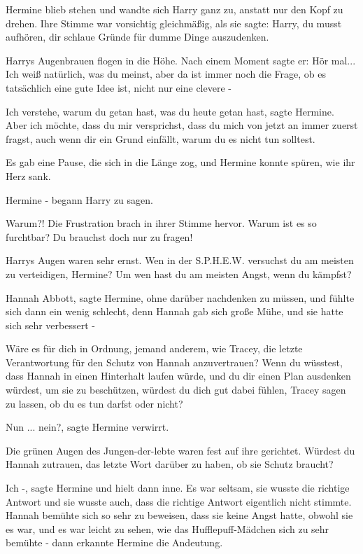 Hermine blieb stehen und wandte sich Harry ganz zu, anstatt nur den Kopf zu
drehen. Ihre Stimme war vorsichtig gleichmäßig, als sie sagte: \glqq{}Harry, du
musst aufhören, dir schlaue Gründe für dumme Dinge auszudenken.\grqq{}

Harrys Augenbrauen flogen in die Höhe. Nach einem Moment sagte er: \glqq{}Hör
mal... Ich weiß natürlich, was du meinst, aber da ist immer noch die Frage, ob
es tatsächlich eine gute Idee ist, nicht nur eine clevere -\grqq{}

\glqq{}Ich verstehe, warum du getan hast, was du heute getan hast\grqq{}, sagte
Hermine. \glqq{}Aber ich möchte, dass du mir versprichst, dass du mich von jetzt
an immer zuerst fragst, auch wenn dir ein Grund einfällt, warum du es nicht tun
solltest.\grqq{}

Es gab eine Pause, die sich in die Länge zog, und Hermine konnte spüren, wie ihr
Herz sank.

\glqq{}Hermine -\grqq{} begann Harry zu sagen.

\glqq{}Warum?!\grqq{} Die Frustration brach in ihrer Stimme hervor. \glqq{}Warum
ist es so furchtbar? Du brauchst doch nur zu fragen!\grqq{}

Harrys Augen waren sehr ernst. \glqq{}Wen in der S.P.H.E.W. versuchst du am
meisten zu verteidigen, Hermine? Um wen hast du am meisten Angst, wenn du
kämpfst?\grqq{}

\glqq{}Hannah Abbott\grqq{}, sagte Hermine, ohne darüber nachdenken zu müssen,
und fühlte sich dann ein wenig schlecht, denn Hannah gab sich große Mühe, und
sie hatte sich sehr verbessert -

\glqq{}Wäre es für dich in Ordnung, jemand anderem, wie Tracey, die letzte
Verantwortung für den Schutz von Hannah anzuvertrauen? Wenn du wüsstest, dass
Hannah in einen Hinterhalt laufen würde, und du dir einen Plan ausdenken
würdest, um sie zu beschützen, würdest du dich gut dabei fühlen, Tracey sagen zu
lassen, ob du es tun darfst oder nicht?\grqq{}

\glqq{}Nun ... nein?\grqq{}, sagte Hermine verwirrt.

Die grünen Augen des Jungen-der-lebte waren fest auf ihre gerichtet. \glqq{}
Würdest du Hannah zutrauen, das letzte Wort darüber zu haben, ob sie Schutz
braucht?\grqq{}

\glqq{}Ich -\grqq{}, sagte Hermine und hielt dann inne. Es war seltsam, sie
wusste die richtige Antwort und sie wusste auch, dass die richtige Antwort
eigentlich nicht stimmte. Hannah bemühte sich so sehr zu beweisen, dass sie
keine Angst hatte, obwohl sie es war, und es war leicht zu sehen, wie das
Hufflepuff-Mädchen sich zu sehr bemühte - dann erkannte Hermine die Andeutung.

